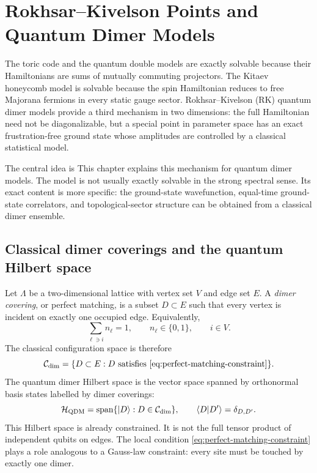 
\chapter{Rokhsar--Kivelson Points and Quantum Dimer Models}
\label{chap:rk-qdm}

The toric code and the quantum double models are exactly solvable because their
Hamiltonians are sums of mutually commuting projectors.  The Kitaev honeycomb
model is solvable because the spin Hamiltonian reduces to free Majorana
fermions in every static gauge sector.  Rokhsar--Kivelson (RK) quantum dimer
models provide a third mechanism in two dimensions: the full Hamiltonian need
not be diagonalizable, but a special point in parameter space has an exact
frustration-free ground state whose amplitudes are controlled by a classical
statistical model.

The central idea is
This chapter explains this mechanism for quantum dimer models.  The model is
not usually exactly solvable in the strong spectral sense.  Its exact content is
more specific: the ground-state wavefunction, equal-time ground-state
correlators, and topological-sector structure can be obtained from a classical
dimer ensemble.

\section{Classical dimer coverings and the quantum Hilbert space}
\label{sec:qdm-hilbert-space}

Let \(\Lambda\) be a two-dimensional lattice with vertex set \(V\) and edge set
\(E\).  A \emph{dimer covering}, or perfect matching, is a subset
\(D\subset E\) such that every vertex is incident on exactly one occupied edge.
Equivalently,
\begin{equation}
\label{eq:perfect-matching-constraint}
    \sum_{\ell\ni i} n_{\ell}=1,
    \qquad
    n_{\ell}\in\{0,1\},
    \qquad
    i\in V .
\end{equation}
The classical configuration space is therefore
\begin{equation}
\label{eq:dimer-configuration-space}
    \mathcal{C}_{\rm dim}
    =
    \{D\subset E:\text{\(D\) satisfies \cref{eq:perfect-matching-constraint}}\}.
\end{equation}
The quantum dimer Hilbert space is the vector space spanned by orthonormal basis
states labelled by dimer coverings:
\begin{equation}
\label{eq:qdm-hilbert-space}
    \mathcal{H}_{\rm QDM}
    =
    \operatorname{span}\{\left|D\right\rangle:D\in\mathcal{C}_{\rm dim}\},
    \qquad
    \left\langle D\middle|D'\right\rangle=\delta_{D,D'} .
\end{equation}
This Hilbert space is already constrained.  It is not the full tensor product of
independent qubits on edges.  The local condition \cref{eq:perfect-matching-constraint}
plays a role analogous to a Gauss-law constraint: every site must be touched by
exactly one dimer.

